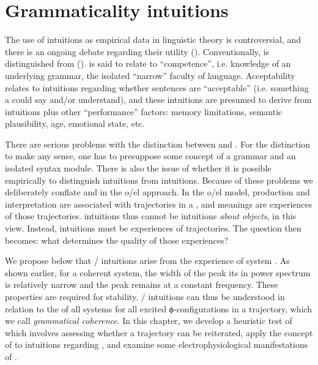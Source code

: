 \chapter{Grammaticality intuitions}

The use of  intuitions as empirical data in linguistic theory is controversial, and there is an ongoing debate regarding their utility (\citealt{CulicoverJackendoff2010,FFerreira2005,GibsonFedorenko2010,GibsonFedorenko2013,SprouseAlmeida2013}). Conventionally,  is distinguished from  (\citealt{Schütze2016,Sprouse2007}).  is said to relate to “competence”, i.e. knowledge of an underlying grammar, the isolated “narrow” faculty of language. Acceptability relates to intuitions regarding whether sentences are “acceptable” (i.e. something a  could say and/or understand), and these intuitions are presumed to derive from  intuitions plus other “performance” factors: memory limitations, semantic plausibility,  age, emotional state, etc. 

  There are serious problems with the distinction between  and . For the distinction to make any sense, one has to presuppose some concept of a grammar and an isolated syntax module. There is also the issue of whether it is possible empirically to distinguish  intuitions from  intuitions. Because of these problems we deliberately conflate  and  in the o/el approach. In the o/el model, production and interpretation are associated with trajectories in a , and meanings are experiences of those trajectories.  intuitions thus cannot be intuitions \textit{about objects}, in this view. Instead,  intuitions must be experiences of trajectories. The question then becomes: what determines the quality of those experiences? 

  We propose below that / intuitions arise from the experience of system . As shown earlier, for a coherent system, the width of the peak its in power spectrum is relatively narrow and the peak remains at a constant frequency. These properties are required for stability. / intuitions can thus be understood in relation to the  of all systems for all excited ϕ-configurations in a trajectory, which we call \textit{grammatical coherence}. In this chapter, we develop a heuristic test of  which involves assessing whether a trajectory can be reiterated, apply the concept of  to intuitions regarding , and examine some electrophysiological manifestations of . 

